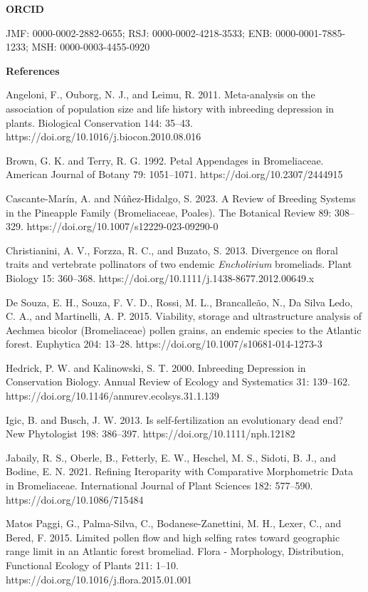 \documentclass[
]{article}
\begin{document}
\textbf{ORCID}

JMF: 0000-0002-2882-0655; RSJ: 0000-0002-4218-3533; ENB:
0000-0001-7885-1233; MSH: 0000-0003-4455-0920

\textbf{References}

Angeloni, F., Ouborg, N. J., and Leimu, R. 2011. Meta-analysis on the
association of population size and life history with inbreeding
depression in plants. Biological Conservation 144: 35--43.
https://doi.org/10.1016/j.biocon.2010.08.016

Brown, G. K. and Terry, R. G. 1992. Petal Appendages in Bromeliaceae.
American Journal of Botany 79: 1051--1071.
https://doi.org/10.2307/2444915

Cascante-Marín, A. and Núñez-Hidalgo, S. 2023. A Review of Breeding
Systems in the Pineapple Family (Bromeliaceae, Poales). The Botanical
Review 89: 308--329. https://doi.org/10.1007/s12229-023-09290-0

Christianini, A. V., Forzza, R. C., and Buzato, S. 2013. Divergence on
floral traits and vertebrate pollinators of two endemic
\emph{Encholirium} bromeliads. Plant Biology 15: 360--368.
https://doi.org/10.1111/j.1438-8677.2012.00649.x

De Souza, E. H., Souza, F. V. D., Rossi, M. L., Brancalleão, N., Da
Silva Ledo, C. A., and Martinelli, A. P. 2015. Viability, storage and
ultrastructure analysis of Aechmea bicolor (Bromeliaceae) pollen grains,
an endemic species to the Atlantic forest. Euphytica 204: 13--28.
https://doi.org/10.1007/s10681-014-1273-3

Hedrick, P. W. and Kalinowski, S. T. 2000. Inbreeding Depression in
Conservation Biology. Annual Review of Ecology and Systematics 31:
139--162. https://doi.org/10.1146/annurev.ecolsys.31.1.139

Igic, B. and Busch, J. W. 2013. Is self‐fertilization an evolutionary
dead end? New Phytologist 198: 386--397.
https://doi.org/10.1111/nph.12182

Jabaily, R. S., Oberle, B., Fetterly, E. W., Heschel, M. S., Sidoti, B.
J., and Bodine, E. N. 2021. Refining Iteroparity with Comparative
Morphometric Data in Bromeliaceae. International Journal of Plant
Sciences 182: 577--590. https://doi.org/10.1086/715484

Matos Paggi, G., Palma-Silva, C., Bodanese-Zanettini, M. H., Lexer, C.,
and Bered, F. 2015. Limited pollen flow and high selfing rates toward
geographic range limit in an Atlantic forest bromeliad. Flora -
Morphology, Distribution, Functional Ecology of Plants 211: 1--10.
https://doi.org/10.1016/j.flora.2015.01.001
\end{document}
